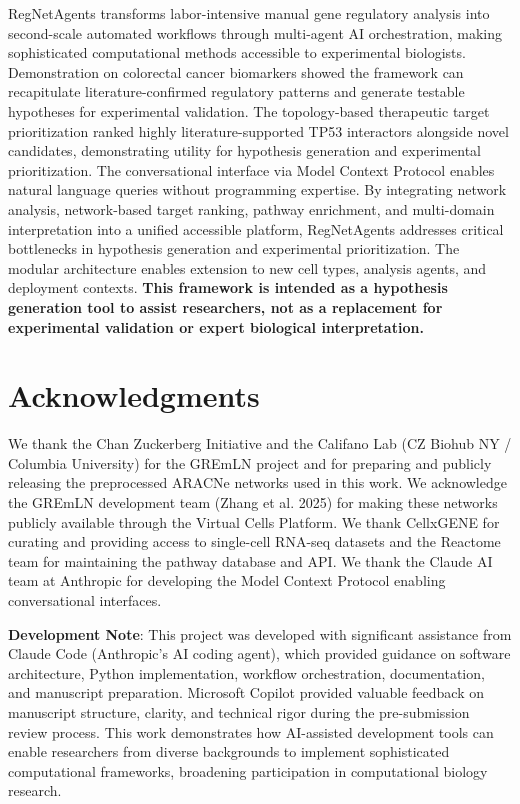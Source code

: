 \documentclass[11pt]{article}
\begin{document}
RegNetAgents transforms labor-intensive manual gene regulatory analysis into second-scale automated workflows through multi-agent AI orchestration, making sophisticated computational methods accessible to experimental biologists. Demonstration on colorectal cancer biomarkers showed the framework can recapitulate literature-confirmed regulatory patterns and generate testable hypotheses for experimental validation. The topology-based therapeutic target prioritization ranked highly literature-supported TP53 interactors alongside novel candidates, demonstrating utility for hypothesis generation and experimental prioritization. The conversational interface via Model Context Protocol enables natural language queries without programming expertise. By integrating network analysis, network-based target ranking, pathway enrichment, and multi-domain interpretation into a unified accessible platform, RegNetAgents addresses critical bottlenecks in hypothesis generation and experimental prioritization. The modular architecture enables extension to new cell types, analysis agents, and deployment contexts. \textbf{This framework is intended as a hypothesis generation tool to assist researchers, not as a replacement for experimental validation or expert biological interpretation.}

\section*{Acknowledgments}

We thank the Chan Zuckerberg Initiative and the Califano Lab (CZ Biohub NY / Columbia University) for the GREmLN project and for preparing and publicly releasing the preprocessed ARACNe networks used in this work. We acknowledge the GREmLN development team (Zhang et al. 2025) for making these networks publicly available through the Virtual Cells Platform. We thank CellxGENE for curating and providing access to single-cell RNA-seq datasets and the Reactome team for maintaining the pathway database and API. We thank the Claude AI team at Anthropic for developing the Model Context Protocol enabling conversational interfaces.

\textbf{Development Note}: This project was developed with significant assistance from Claude Code (Anthropic's AI coding agent), which provided guidance on software architecture, Python implementation, workflow orchestration, documentation, and manuscript preparation. Microsoft Copilot provided valuable feedback on manuscript structure, clarity, and technical rigor during the pre-submission review process. This work demonstrates how AI-assisted development tools can enable researchers from diverse backgrounds to implement sophisticated computational frameworks, broadening participation in computational biology research.
\end{document}
